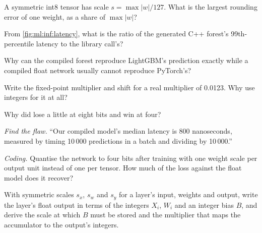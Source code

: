 \begin{exercise}[$\star$]\label{exo:ml:low-latency-inference:1}
A symmetric int8 tensor has scale $s = \max|w|/127$. What is the largest rounding error of one weight, as a share of $\max|w|$?
\end{exercise}

\begin{exercise}[$\star$]\label{exo:ml:low-latency-inference:2}
From \cref{fig:ml:inf:latency}, what is the ratio of the generated C++ forest's 99th-percentile latency to the library call's?
\end{exercise}

\begin{exercise}[$\star$]\label{exo:ml:low-latency-inference:3}
Why can the compiled forest reproduce LightGBM's prediction exactly while a compiled float network usually cannot reproduce
PyTorch's?
\end{exercise}

\begin{exercise}[$\star\star$]\label{exo:ml:low-latency-inference:4}
Write the fixed-point multiplier and shift for a real multiplier of 0.0123. Why use integers for it at all?
\end{exercise}

\begin{exercise}[$\star\star$]\label{exo:ml:low-latency-inference:5}
Why did  lose a little at eight bits and win at four?
\end{exercise}

\begin{exercise}[$\star\star$]\label{exo:ml:low-latency-inference:6}
\emph{Find the flaw.} ``Our compiled model's median latency is 800 nanoseconds, measured by timing 10\,000 predictions in a
batch and dividing by 10\,000.''
\end{exercise}

\begin{exercise}[$\star\star\star$]\label{exo:ml:low-latency-inference:7}
\emph{Coding.} Quantise the network to four bits after training with one weight scale per output unit instead of one per
tensor. How much of the loss against the float model does it recover?
\end{exercise}

\begin{exercise}[$\star\star\star$]\label{exo:ml:low-latency-inference:8}
With symmetric scales $s_x$, $s_w$ and $s_y$ for a layer's input, weights and output, write the layer's float output in terms of
the integers $X_i$, $W_i$ and an integer bias $B$, and derive the scale at which $B$ must be stored and the multiplier that maps
the accumulator to the output's integers.
\end{exercise}


